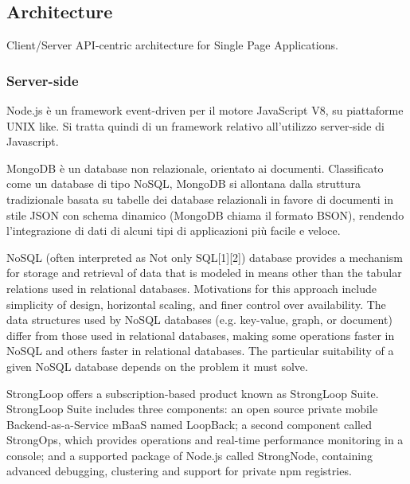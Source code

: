 \documentclass{sig-alternate}
\begin{document}
\subsection{Architecture}

Client/Server API-centric architecture for Single Page Applications.

\subsubsection{Server-side}

\begin{description}
\itemsep1pt\parskip0pt
	\item[Node.js web framework] 
		Node.js \`e un framework event-driven per il motore JavaScript V8, su piattaforme UNIX like. Si tratta quindi di un framework relativo all'utilizzo server-side di Javascript.
	\item[MongDB]
		MongoDB \`e un database non relazionale, orientato ai documenti. Classificato come un database di tipo NoSQL, MongoDB si allontana dalla struttura tradizionale basata su tabelle dei database relazionali in favore di documenti in stile JSON con schema dinamico (MongoDB chiama il formato BSON), rendendo l'integrazione di dati di alcuni tipi di applicazioni pi\`u facile e veloce.
\item[NoSQL]
		NoSQL (often interpreted as Not only SQL[1][2]) database provides a mechanism for storage and retrieval of data that is modeled in means other than the tabular relations used in relational databases. Motivations for this approach include simplicity of design, horizontal scaling, and finer control over availability. The data structures used by NoSQL databases (e.g. key-value, graph, or document) differ from those used in relational databases, making some operations faster in NoSQL and others faster in relational databases. The particular suitability of a given NoSQL database depends on the problem it must solve. 
	\item[Strongloop]
		StrongLoop offers a subscription-based product known as StrongLoop Suite. StrongLoop Suite includes three components: an open source private mobile Backend-as-a-Service mBaaS named LoopBack; a second component called StrongOps, which provides operations and real-time performance monitoring in a console; and a supported package of Node.js called StrongNode, containing advanced debugging, clustering and support for private npm registries.
\end{description}
\end{document}
